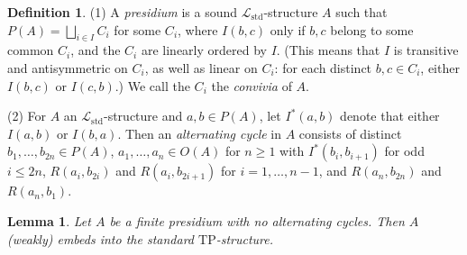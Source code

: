\documentclass{amsart}
\newtheorem{lemma}[theorem]{Lemma}
\theoremstyle{definition}
\newtheorem{definition}[theorem]{Definition}
\theoremstyle{remark}
\numberwithin{equation}{section}
\begin{document}
\begin{definition}
\label{alternating cycle}    
    (1) A \textit{presidium} is a sound $\mathcal{L}_{\mathrm{std}}$-structure $A$ such that $P(A) = \bigsqcup_{i \in I} C_i$ for some $C_i$, where $I(b, c)$ only if $b, c $ belong to some common $C_i$, and the $C_i$ are linearly ordered by $I$. (This means that $I$ is transitive and antisymmetric on $C_i$, as well as linear on $C_i$: for each distinct $b, c \in C_{i}$, either $I(b,c)$ or $I(c, b)$.) We call the $C_{i}$ the \textit{convivia} of $A$.

    (2) For $A$ an $\mathcal{L}_{\mathrm{std}}$-structure and $a, b \in P(A)$, let $I^{*}(a, b)$ denote that either $I(a, b)$ or $I(b, a)$. Then an \textit{alternating cycle} in $A$ consists of distinct $b_{1}, \ldots, b_{2n} \in P(A)$, $a_1, \ldots, a_n \in O(A)$ for $n \geq 1$ with $I^{*}(b_i, b_{i+1} )$ for odd $i \leq 2n$, $R(a_i, b_{2i})$ and $R(a_i, b_{2i+1})$ for $i= 1, \ldots, n-1$, and $R(a_n, b_{2n})$ and $R(a_n, b_{1})$. 
\end{definition}


\begin{lemma}
    \label{embedding into the standard tp-structure} Let $A$ be a finite presidium with no alternating cycles. Then $A$ (weakly) embeds into the standard $\mathrm{TP}$-structure.
\end{lemma}
\end{document}
